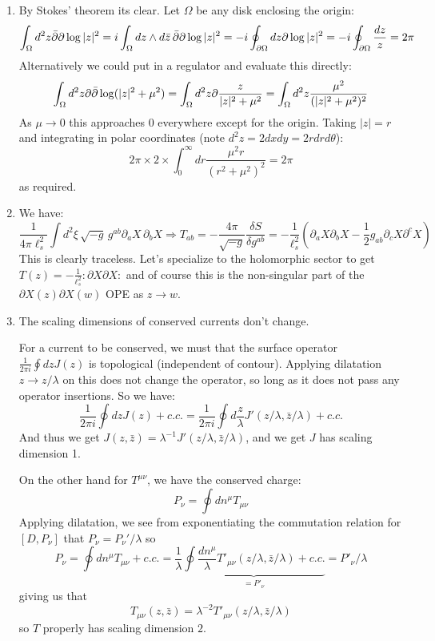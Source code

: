 \documentclass[11pt]{article}
\begin{document}
\begin{enumerate}
	\item By Stokes' theorem its clear. Let $\Omega$ be any disk enclosing the origin: 
	\[
		\int_{\Omega} d^2 z \bar {\partial} \partial \log |z|^2 =  i \int_{\Omega} dz \wedge d\bar z \,\bar {\partial} \partial \log|z|^2 = -i \oint_{\partial \Omega} dz \partial \log|z|^2 = - i \oint_{\partial \Omega} \frac{dz}{z} = 2\pi 
	\]
	Alternatively we could put in a regulator and evaluate this directly:
	\[
		\int_\Omega d^2 z \partial \bar {\partial} \log(|z|^2 + \mu^2) = \int_\Omega d^2 z \partial \frac{z}{|z|^2 + \mu^2} = \int_\Omega d^2 z \frac{\mu^2}{(|z|^2 + \mu^2)^2}
	\]
	As $\mu \to 0$ this approaches $0$ everywhere except for the origin. Taking $|z| = r$ and integrating in polar coordinates (note $d^2 z = 2 dx dy = 2 r dr d\theta$):
	\[
		2\pi \times 2 \times \int_{0}^\infty dr \frac{\mu^2 r}{(r^2 + \mu^2)^2} = 2 \pi
	\]
	as required.
	
	\item We have:
	\[
		\frac{1}{4 \pi \ell_s^2} \int d^2 \xi \, \sqrt{-g}\, g^{ab} \partial_a X\, \partial_b X \Rightarrow T_{ab} = -\frac{4\pi}{\sqrt{-g}} \frac{\delta S}{\delta g^{ab}} = -\frac{1}{\ell_s^2} \left( \partial_a X \partial_b X - \frac12 g_{ab} \partial_c X \partial^c X \right)
	\]
	This is clearly traceless. Let's specialize to the holomorphic sector to get $T(z) = -\frac{1}{\ell_s^2} :\partial X \partial X:$ and of course this is the non-singular part of the $\partial X(z) \partial X(w)$ OPE as $z \to w$.
	
	
	\item The scaling dimensions of conserved currents don't change.
	
	For a current to be conserved, we must that the surface operator $\frac{1}{2\pi i} \oint dz J(z)$ is topological (independent of contour). Applying dilatation $z \to z/\lambda$ on this does not change the operator, so long as it does not pass any operator insertions. So we have:
	\[
		\frac{1}{2\pi i} \oint dz J(z) + c.c. = \frac{1}{2\pi i} \oint d\frac{z}{
		\lambda} J'(z/\lambda, \bar z/\lambda) + c.c.
	\]
	And thus we get $J(z, \bar z) = \lambda^{-1} J'(z/\lambda, \bar z/\lambda)$, and we get $J$ has scaling dimension 1.
	
	On the other hand for $T^{\mu \nu}$, we have the conserved charge:
	\[
		P_\nu = \oint dn^\mu T_{\mu \nu}
	\]
	Applying dilatation, we see from exponentiating the commutation relation for $[D, P_\nu]$ that $P_\nu = P_\nu'/\lambda$ so
	\[
		P_\nu = \oint dn^\mu T_{\mu \nu} + c.c. = \frac{1}{\lambda} \underbrace{\oint \frac{dn^\mu}{\lambda} T'_{\mu \nu}(z/\lambda, \bar z/\lambda) + c.c.}_{= P'_\nu} = P'_\nu/\lambda
	\]
	giving us that
	\[
		T_{\mu \nu}(z, \bar z) = \lambda^{-2} T'_{\mu \nu}(z/\lambda, \bar z/\lambda)
	\]
	so $T$ properly has scaling dimension $2$.
	

\end{enumerate}
\end{document}
